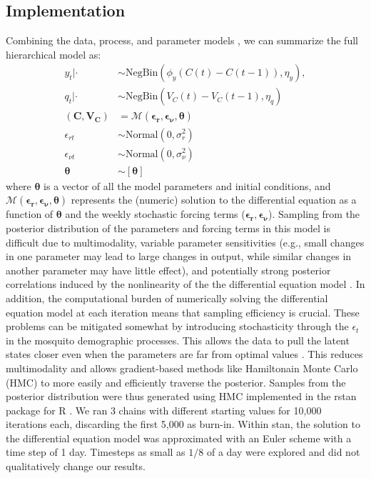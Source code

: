 \documentclass[10pt,letterpaper]{article}
\begin{document}
\subsection*{Implementation}

Combining the data, process, and parameter models \cite{Berliner1996}, we can summarize the full hierarchical model as:
\begin{align}
y_t | \cdot & \sim \text{NegBin}(\phi_y (C(t) - C(t-1)), \eta_y),
\\
q_t | \cdot &\sim \text{NegBin}(V_{C}(t) - V_{C}(t-1), \eta_q)\\
(\mathbf{C}, \mathbf{V_C}) & = \mathcal{M}(\boldsymbol{\epsilon_r}, \boldsymbol{\epsilon_{\nu}},\boldsymbol{\theta})\\
\epsilon_{rt} & \sim \text{Normal}(0, \sigma^2_r)\\
\epsilon_{\nu t} & \sim \text{Normal}(0, \sigma^2_{\nu})\\
\boldsymbol{\theta} & \sim [\boldsymbol{\theta}]
\end{align}
where $\boldsymbol{\theta}$ is a vector of all the model parameters and initial conditions, and $\mathcal{M}(\boldsymbol{\epsilon_r}, \boldsymbol{\epsilon_{\nu}},\boldsymbol{\theta})$ represents the (numeric) solution to the differential equation as a function of $\boldsymbol{\theta}$ and the weekly stochastic forcing terms ($\boldsymbol{\epsilon_{r}}, \boldsymbol{\epsilon_{\nu}}$).
Sampling from the posterior distribution of the parameters and forcing terms in this model is difficult due to multimodality, variable parameter sensitivities (e.g., small changes in one parameter may lead to large changes in output, while similar changes in another parameter may have little effect), and potentially strong posterior correlations induced by the nonlinearity of the the differential equation model \cite{Reilly2005, Girolami2008, Calderhead2011}.
In addition, the computational burden of numerically solving the differential equation model at each iteration means that sampling efficiency is crucial.
These problems can be mitigated somewhat by introducing stochasticity through the $\epsilon_t$ in the mosquito demographic processes.
This allows the data to pull the latent states closer even when the parameters are far from optimal values \cite{Leander2014}.
This reduces multimodality and allows gradient-based methods like Hamiltonain Monte Carlo (HMC) to more easily and efficiently traverse the posterior.
Samples from the posterior distribution were thus generated using HMC implemented in the rstan package \cite{Carpenter2016, Rstan2017} for R \cite{R2016}. 
We ran 3 chains with different starting values for 10,000 iterations each, discarding the first 5,000 as burn-in.
Within stan, the solution to the differential equation model was approximated with an Euler scheme with a time step of 1 day.  
Timesteps as small as $1/8$ of a day were explored and did not qualitatively change our results.
\end{document}
